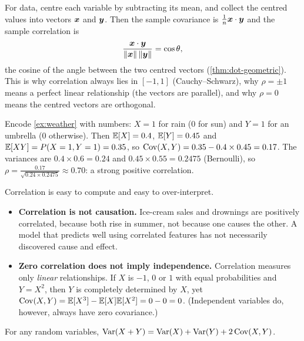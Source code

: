 \begin{intuition}
For data, centre each variable by subtracting its mean, and collect the centred
values into vectors $\bm{x}$ and $\bm{y}$. Then the sample covariance is
$\frac1n\bm{x}\cdot\bm{y}$ and the sample correlation is
\[
  \frac{\bm{x}\cdot\bm{y}}{\lVert\bm{x}\rVert\,\lVert\bm{y}\rVert} = \cos\theta,
\]
the cosine of the angle between the two centred vectors
(\cref{thm:dot-geometric}). This is why correlation always lies in $[-1, 1]$
(Cauchy--Schwarz), why $\rho = \pm1$ means a perfect linear relationship (the
vectors are parallel), and why $\rho = 0$ means the centred vectors are
orthogonal.
\end{intuition}

\begin{example}
Encode \cref{ex:weather} with numbers: $X = 1$ for rain ($0$ for sun) and $Y = 1$
for an umbrella ($0$ otherwise). Then $\mathbb{E}[X] = 0.4$, $\mathbb{E}[Y] = 0.45$ and $\mathbb{E}[XY] =
P(X = 1, Y = 1) = 0.35$, so $\operatorname{Cov}(X, Y) = 0.35 - 0.4\times0.45 = 0.17$. The
variances are $0.4\times0.6 = 0.24$ and $0.45\times0.55 = 0.2475$ (Bernoulli), so
$\rho = \frac{0.17}{\sqrt{0.24\times0.2475}} \approx 0.70$: a strong positive
correlation.
\end{example}

\begin{pitfall}
Correlation is easy to compute and easy to over-interpret.
\begin{itemize}
  \item \textbf{Correlation is not causation.} Ice-cream sales and drownings are
    positively correlated, because both rise in summer, not because one causes the
    other. A model that predicts well using correlated features has not
    necessarily discovered cause and effect.
  \item \textbf{Zero correlation does not imply independence.} Correlation
    measures only \emph{linear} relationships. If $X$ is $-1$, $0$ or $1$ with equal
    probabilities and $Y = X^2$, then $Y$ is completely determined by $X$, yet
    $\operatorname{Cov}(X, Y) = \mathbb{E}[X^3] - \mathbb{E}[X]\mathbb{E}[X^2] = 0 - 0 = 0$. (Independent variables do,
    however, always have zero covariance.)
\end{itemize}
\end{pitfall}

\begin{theorem}\label{thm:variance-sum}
For any random variables, $\operatorname{Var}(X + Y) = \operatorname{Var}(X) + \operatorname{Var}(Y) + 2\operatorname{Cov}(X, Y)$.
\end{theorem}

